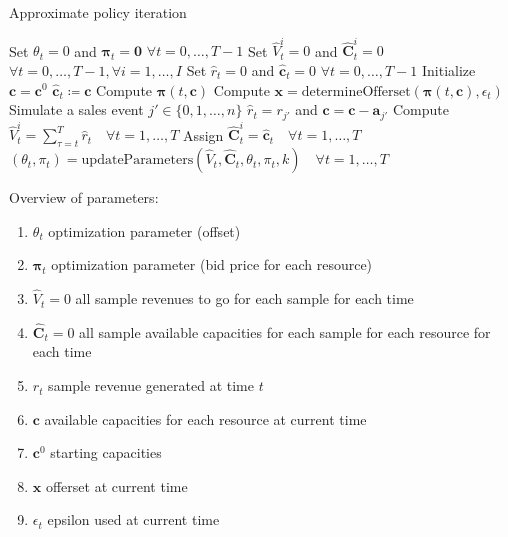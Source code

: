 \begin{algorithm}
	\caption{Approximate policy iteration}\label{alg-API}
	\begin{algorithmic}[1]
		\State Set $\theta_t = 0$ and $\mathbf{\pi}_t = \mathbf{0}$ $\forall t = 0, \dots, T-1$ \label{alg-API1}
		 \label{alg-API-Piter1}
		\State Set $\hat{V}_t^i = 0$ and $\mathbf{\hat{C}}_t^i = 0$ $\forall t = 0, \dots, T-1, \forall i = 1, \dots, I$\label{alg-API-Piter2}\label{alg-API3}
		\label{alg-API-Peval1}
		\State Set $\hat{r}_t = 0$ and $\mathbf{\hat{c}}_t = 0$ $\forall t = 0, \dots, T-1$\label{alg-API5}
		\State Initialize $\mathbf{c} = \mathbf{c}^0$\label{alg-API6}
		\State $\mathbf{\hat{c}}_t \coloneqq \mathbf{c}$\label{alg-API8}
		\State Compute $\mathbf{\pi}(t, \mathbf{c})$ \label{alg-API-calcPi}\label{alg-API9}
		\State Compute $\mathbf{x} = \text{determineOfferset}(\mathbf{\pi}(t, \mathbf{c}), \epsilon_t)$\label{alg-API10}
		\State Simulate a sales event $j' \in \{0, 1, \dots, n\}$\label{alg-API11}
		\State $\hat{r}_t = r_{j'}$ and $\mathbf{c} = \mathbf{c} - \mathbf{a}_{j'}$\label{alg-API13}
		\EndIf
		\EndFor
		\State Compute $\hat{V}_t^i = \sum_{\tau = t}^{T}\hat{r}_t \quad \forall t = 1, \dots, T$\label{alg-API14}
		\State Assign $\mathbf{\hat{C}}_t^i = \mathbf{\hat{c}}_t \quad \forall t = 1, \dots, T$\label{alg-API15} \label{alg-API-Peval2}
		\EndFor
		\State $\left(\theta_t, \pi_t \right) = \text{updateParameters}\left(\hat{V}_t, \mathbf{\hat{C}}_t, \theta_t, \pi_t, k\right) \quad \forall t = 1, \dots, T$ \label{alg-API-updateParam}\label{alg-API-Piter3}
		\EndFor
	\end{algorithmic}
\end{algorithm}


Overview of parameters:
\begin{enumerate}
	\item $\theta_t$	optimization parameter (offset)
	\item $\mathbf{\pi}_t$	optimization parameter (bid price for each resource)
	\item $\hat{V}_t = 0$	all sample revenues to go for each sample for each time
	\item $\mathbf{\hat{C}}_t = 0$	all sample available capacities for each sample for each resource for each time
	\item $r_t$	sample revenue generated at time $t$
	\item $\mathbf{c}$	available capacities for each resource at current time
	\item $\mathbf{c}^0$	starting capacities
	\item $\mathbf{x}$ offerset at current time
	\item $\epsilon_t$ epsilon used at current time
	
\end{enumerate}


